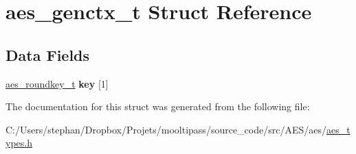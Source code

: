 \hypertarget{structaes__genctx__t}{\section{aes\-\_\-genctx\-\_\-t Struct Reference}
\label{structaes__genctx__t}
}
\subsection*{Data Fields}
\begin{DoxyCompactItemize}
\item 
\hypertarget{structaes__genctx__t_ad14597dc3319c5b64b7a5766962d1f5b}{\hyperlink{structaes__roundkey__t}{aes\-\_\-roundkey\-\_\-t} {\bfseries key} \mbox{[}1\mbox{]}}\label{structaes__genctx__t_ad14597dc3319c5b64b7a5766962d1f5b}

\end{DoxyCompactItemize}


The documentation for this struct was generated from the following file\-:\begin{DoxyCompactItemize}
\item 
C\-:/\-Users/stephan/\-Dropbox/\-Projets/mooltipass/source\-\_\-code/src/\-A\-E\-S/aes/\hyperlink{aes__types_8h}{aes\-\_\-types.\-h}\end{DoxyCompactItemize}
